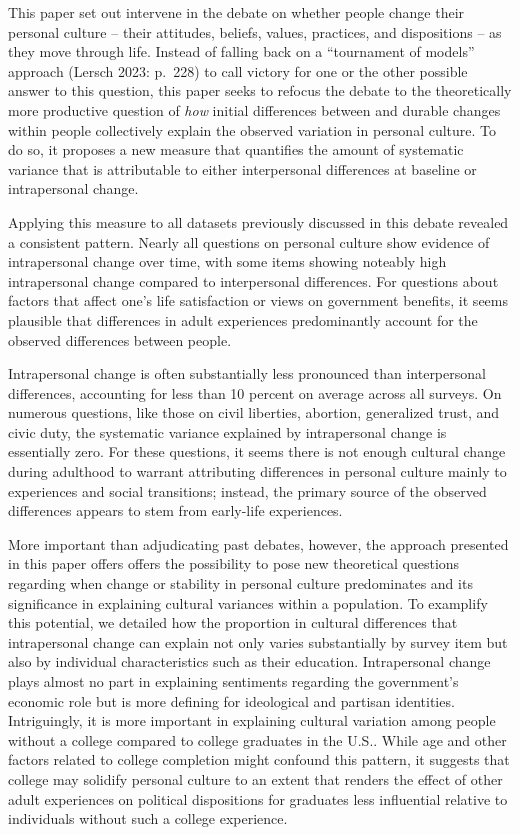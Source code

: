 \documentclass[
  11pt,
]{article}
\begin{document}
This paper set out intervene in the debate on whether people change
their personal culture -- their attitudes, beliefs, values, practices,
and dispositions -- as they move through life. Instead of falling back
on a ``tournament of models'' approach (Lersch 2023: p.~228) to call
victory for one or the other possible answer to this question, this
paper seeks to refocus the debate to the theoretically more productive
question of \emph{how} initial differences between and durable changes
within people collectively explain the observed variation in personal
culture. To do so, it proposes a new measure that quantifies the amount
of systematic variance that is attributable to either interpersonal
differences at baseline or intrapersonal change.

Applying this measure to all datasets previously discussed in this
debate revealed a consistent pattern. Nearly all questions on personal
culture show evidence of intrapersonal change over time, with some items
showing noteably high intrapersonal change compared to interpersonal
differences. For questions about factors that affect one's life
satisfaction or views on government benefits, it seems plausible that
differences in adult experiences predominantly account for the observed
differences between people.

Intrapersonal change is often substantially less pronounced than
interpersonal differences, accounting for less than 10 percent on
average across all surveys. On numerous questions, like those on civil
liberties, abortion, generalized trust, and civic duty, the systematic
variance explained by intrapersonal change is essentially zero. For
these questions, it seems there is not enough cultural change during
adulthood to warrant attributing differences in personal culture mainly
to experiences and social transitions; instead, the primary source of
the observed differences appears to stem from early-life experiences.

More important than adjudicating past debates, however, the approach
presented in this paper offers offers the possibility to pose new
theoretical questions regarding when change or stability in personal
culture predominates and its significance in explaining cultural
variances within a population. To examplify this potential, we detailed
how the proportion in cultural differences that intrapersonal change can
explain not only varies substantially by survey item but also by
individual characteristics such as their education. Intrapersonal change
plays almost no part in explaining sentiments regarding the government's
economic role but is more defining for ideological and partisan
identities. Intriguingly, it is more important in explaining cultural
variation among people without a college compared to college graduates
in the U.S.. While age and other factors related to college completion
might confound this pattern, it suggests that college may solidify
personal culture to an extent that renders the effect of other adult
experiences on political dispositions for graduates less influential
relative to individuals without such a college experience.
\end{document}
